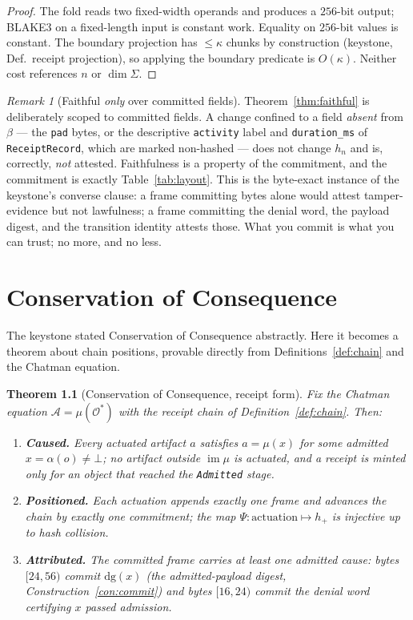 \documentclass[11pt,oneside]{book}
\theoremstyle{definition}
\theoremstyle{plain}
\newtheorem{theorem}{Theorem}[chapter]
\theoremstyle{remark}
\newtheorem*{remark}{Remark}
\newcommand{\Adm}{\mathcal{O}^{*}}             %
\newcommand{\Act}{\mathcal{A}}                 %
\newcommand{\muop}{\mu}                        %
\newcommand{\adm}{\alpha}                      %
\newcommand{\Rfsl}{\bot}                        %
\newcommand{\CL}{\kappa}                       %
\newcommand{\dg}{\mathrm{dg}}                   %
\DeclareMathOperator{\im}{im}
\newcommand{\body}{\beta}                       %
\newcommand{\code}[1]{\texttt{#1}}
\newcommand{\Sig}{\Sigma}                       %
\begin{document}
\begin{proof}
The fold reads two fixed-width operands and produces a $256$-bit output; BLAKE3 on a
fixed-length input is constant work. %
Equality on $256$-bit values is constant. %
The boundary
projection has $\le\CL$ chunks by construction (keystone, Def.\ receipt projection), so
applying the boundary predicate is $O(\CL)$. %
Neither cost references $n$ or $\dim\Sig$. %
\end{proof}

\begin{remark}[Faithful \emph{only} over committed fields]
Theorem~\ref{thm:faithful} is deliberately scoped to committed fields. %
A change confined to a
field \emph{absent} from $\body$ --- the \code{pad} bytes, or the descriptive
\code{activity} label and \code{duration\_ms} of \code{ReceiptRecord}, which are marked
non-hashed --- does not change $h_n$ and is, correctly, \emph{not} attested. %
Faithfulness is a
property of the commitment, and the commitment is exactly Table~\ref{tab:layout}. %
This is the
byte-exact instance of the keystone's converse clause: a frame committing bytes alone would
attest tamper-evidence but not lawfulness; a frame committing the denial word, the payload
digest, and the transition identity attests those. %
What you commit is what you can trust; no
more, and no less. %
\end{remark}

\chapter{Conservation of Consequence}
\label{ch:conservation}

The keystone stated Conservation of Consequence abstractly. %
Here it becomes a theorem about
chain positions, provable directly from Definitions~\ref{def:chain} and the Chatman equation. %

\begin{theorem}[Conservation of Consequence, receipt form]\label{thm:conservation}
Fix the Chatman equation $\Act=\muop(\Adm)$ with the receipt chain of
Definition~\ref{def:chain}. %
Then: %
\begin{enumerate}[label=(\roman*),leftmargin=*]
\item \textbf{Caused.} Every actuated artifact $a$ satisfies $a=\muop(x)$ for some admitted
$x=\adm(o)\ne\Rfsl$; no artifact outside $\im\muop$ is actuated, and a receipt is minted only
for an object that reached the \code{Admitted} stage. %
\item \textbf{Positioned.} Each actuation appends \emph{exactly one} frame and advances the
chain by \emph{exactly one} commitment; the map $\Psi:\text{actuation}\mapsto h_{+}$ is
injective up to hash collision. %
\item \textbf{Attributed.} The committed frame carries at least one admitted cause: bytes
$[24,56)$ commit $\dg(x)$ (the admitted-payload digest, Construction~\ref{con:commit}) and
bytes $[16,24)$ commit the denial word certifying $x$ passed admission. %
\end{enumerate}
\end{theorem}
\end{document}
